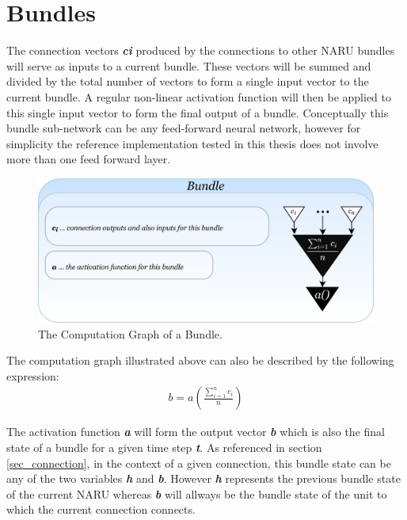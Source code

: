 \clearpage

\section{Bundles}
 
The connection vectors \textbf{\textit{ci}} produced by the connections to other \acs{NARU} bundles will serve as inputs to a current bundle.
These vectors will be summed and divided by the total number of vectors to form a single input vector to the current bundle. A regular non-linear activation function will then be applied to 
this single input vector to form the final output of a bundle. 
Conceptually this bundle sub-network can be any feed-forward neural network, however for simplicity the reference implementation tested in this thesis does not involve more than one feed forward layer. 
 

\begin{figure}[h]
    \includegraphics[width=\textwidth]{PICs/NARU/naru-bundle.png}
    \caption{The Computation Graph of a Bundle.}
    \label{computation-graph-of-a-bundle}
\end{figure}

The computation graph illustrated above can also be described by the following expression:
\begin{align}\label{eq_bundle-activation}
 b = a( \frac{\sum_{i=1}^{n} c_i}{n} ) 
\end{align}

The activation function \textit{\textbf{a}} will form the output vector \textit{\textbf{b}} which is also the final state of a bundle for a given time step \textit{\textbf{t}}. 
As referenced in section \ref{sec_connection}, in the context of a given connection, this bundle state can be any of the two variables \textit{\textbf{h}} and \textit{\textbf{b}}. However \textit{\textbf{h}} represents the previous bundle state of the current \acf{NARU} whereas \textit{\textbf{b}} will allways be the bundle state of the unit to which the current connection connects.

